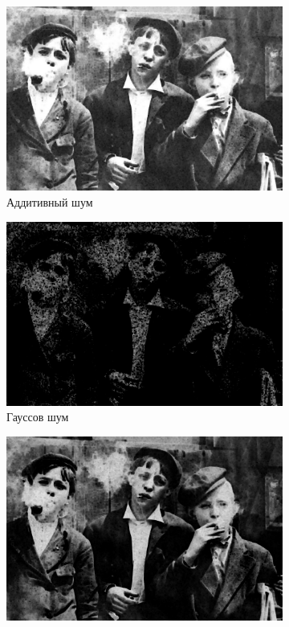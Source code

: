 \begin{figure}[ht!]
\begin{subfigure}[b]{0.5\linewidth}
      \includegraphics[width=0.95\linewidth]{../Rang_Filter/Rang_Additive_noise_(k=5,r=1).jpg} 
      \caption{Аддитивный шум} 
      \label{rang_5_1:c} 
      \vspace{4ex}
    \end{subfigure}%
    \begin{subfigure}[b]{0.5\linewidth}
      \centering
      \includegraphics[width=0.95\linewidth]{../Rang_Filter/Rang_Gaussian_noise_(k=5,r=1).jpg} 
      \caption{Гауссов шум} 
      \label{rang_5_1:d} 
      \vspace{4ex}
    \end{subfigure}
    \begin{subfigure}[b]{0.5\linewidth}
      \centering
      \includegraphics[width=0.95\linewidth]{../Rang_Filter/Rang_Poisson_noise_(k=5,r=1).jpg} 

\end{subfigure}
\end{figure}
